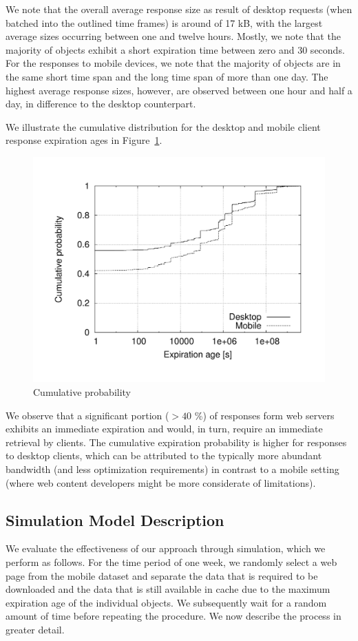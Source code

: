 \documentclass[letterpaper,conference]{IEEEtran}
\begin{document}
We note that the overall average response size as result of desktop requests (when batched into the outlined time frames) is around of 17 kB, with the largest average sizes occurring between one and twelve hours.
Mostly, we note that the majority of objects exhibit a short expiration time between zero and 30 seconds.
For the responses to mobile devices, we note that the majority of objects are in the same short time span and the long time span of more than one day.
The highest average response sizes, however, are observed between one hour and half a day, in difference to the desktop counterpart.

We illustrate the cumulative distribution for the desktop and mobile client response expiration ages in Figure~\ref{fig:comp_cpd}.
\begin{figure}
	\centering
	\includegraphics[width=.95\linewidth]{comp_cpd}
	\caption{Cumulative probability  }
	\label{fig:comp_cpd}
\end{figure}
We observe that a significant portion ($>40$ \%) of responses form web servers exhibits an immediate expiration and would, in turn, require an immediate retrieval by clients.
The cumulative expiration probability is higher for responses to desktop clients, which can be attributed to the typically more abundant bandwidth (and less optimization requirements) in contrast to a mobile setting (where web content developers might be more considerate of limitations).


\subsection{Simulation Model Description}
We evaluate the effectiveness of our approach through simulation, which we perform as follows.
For the time period of one week, we randomly select a web page from the mobile dataset and separate the data that is required to be downloaded and the data that is still available in cache due to the maximum expiration age of the individual objects. We subsequently wait for a random amount of time before repeating the procedure.
We now describe the process in greater detail.
\end{document}
